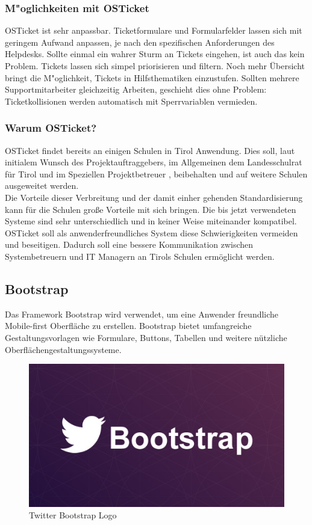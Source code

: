 	\subsubsection{M"oglichkeiten mit OSTicket}
	
	OSTicket ist sehr anpassbar. Ticketformulare und Formularfelder lassen sich mit geringem Aufwand anpassen, je nach den spezifischen Anforderungen des Helpdesks. Sollte einmal ein wahrer Sturm an Tickets eingehen, ist auch das kein Problem. Tickets lassen sich simpel priorisieren und filtern. Noch mehr Übersicht bringt die M"oglichkeit, Tickets in Hilfsthematiken einzustufen. Sollten mehrere Supportmitarbeiter gleichzeitig Arbeiten, geschieht dies ohne Problem: Ticketkollisionen werden automatisch mit Sperrvariablen vermieden.
	
	\subsubsection{Warum OSTicket?}
	OSTicket findet bereits an einigen Schulen in Tirol Anwendung. Dies soll, laut initialem Wunsch des Projektauftraggebers, im Allgemeinen dem Landesschulrat für Tirol und im Speziellen Projektbetreuer \getHammerl , beibehalten und auf weitere Schulen ausgeweitet werden.
	\\
	Die Vorteile dieser Verbreitung und der damit einher gehenden Standardisierung kann für die Schulen große Vorteile mit sich bringen. Die bis jetzt verwendeten Systeme sind sehr unterschiedlich und in keiner Weise miteinander kompatibel. OSTicket soll als anwenderfreundliches System diese Schwierigkeiten vermeiden und beseitigen. Dadurch soll eine bessere Kommunikation zwischen Systembetreuern und IT Managern an Tirols Schulen ermöglicht werden.

	\subsection{Bootstrap} \label{Bootstrap}
	Das Framework Bootstrap wird verwendet, um eine Anwender freundliche Mobile-first Oberfläche zu erstellen. Bootstrap bietet umfangreiche Gestaltungsvorlagen wie Formulare, Buttons, Tabellen und weitere nützliche Oberflächengestaltungssysteme.
	
	\begin{figure}[h]
		\centering
		\includegraphics[scale=0.65]{figures/twitter-bootstrap.jpg}
		\caption{Twitter Bootstrap Logo}
		\label{Bootstrap_Logo}
	\end{figure}
	
